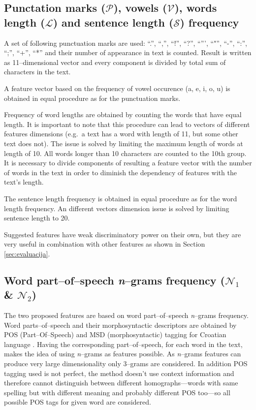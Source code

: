 \documentclass[11pt,english]{article}
\begin{document}
\begin{multicols}{2}
\subsection{Punctation marks ($\mathcal{P}$), vowels ($\mathcal{V}$), words
length ($\mathcal{L}$) and sentence length ($\mathcal{S}$) frequency}
\label{sec:znacajke-manje}
A set of following punctuation marks are used: ``.'', ``,'', ``!'', ``?'',
``''', ``"'', ``-'', ``:'', ``;'', ``+'', ``*'' and their number of appearance in
text is counted. Result is written as 11--dimensional vector and every
component is divided by total sum of characters in the text.

A feature vector based on the frequency of vowel occurence (a, e, i, o, u) is
obtained in equal procedure as for the punctuation marks.

Frequency of word lengths are obtained by counting the words that have equal
length. It is important to note that this procedure can lead to vectors of
different features dimensions (e.g.\ a text has a word with length of 11,
but some other text does not). The issue is solved by limiting the maximum
length of words at length of 10. All words longer than 10 characters are
counted to the 10th group. It is necessary to divide components of resulting a feature
vector with the number of words in the text in order to diminish the dependency
of features with the text's length.

The sentence length frequency is obtained in equal procedure as for the word
length frequency. An different vectors dimension issue is solved by limiting
sentence length to 20.

Suggested features have weak discriminatory power on their own, but they are
very useful in combination with other features as shown in Section \ref{sec:evaluacija}.

\subsection{Word part--of--speech \emph{n}--grams frequency ($\mathcal{N}_1$ \&
$\mathcal{N}_2$)}
\label{sec:ngrami-tipova}
The two proposed features are based on word part--of--speech \emph{n}--grams
frequency. Word parts--of--speech and their morphosyntactic descriptors are obtained by POS
(Part--Of--Speech) and MSD (morphosyntactic) tagging for Croatian language
\citep{snajder08automatic}. Having the corresponding part--of--speech, for
each word in the text, makes the idea of using \emph{n}--grams as features
possible. As \emph{n}--grams features can produce very large dimensionality 
only 3--grams are considered. In addition POS tagging used is not perfect, the
method doesn't use context information and therefore cannot distinguish between
different homographs---words with same spelling but with different meaning and probably
different POS too---so all possible POS tags for given word are considered.


\end{multicols}
\end{document}
